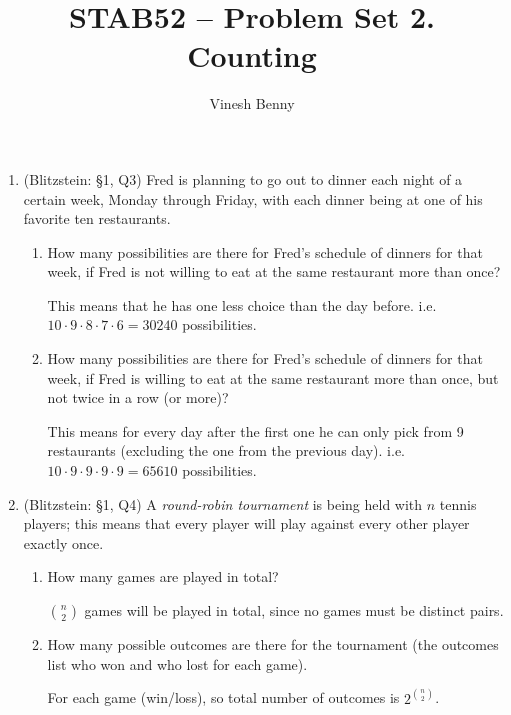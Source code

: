 \documentclass[11pt]{article}
\title{STAB52 -- Problem Set 2. Counting}
\author{Vinesh Benny}
\begin{document}
\begin{enumerate}
	\item (Blitzstein: \S 1, Q3) Fred is planning to go out to dinner each night of a certain week, Monday through Friday, with each dinner being at one of his favorite ten restaurants.
	\begin{enumerate}
		\item How many possibilities are there for Fred’s schedule of dinners for that week, if Fred is not willing to eat at the same restaurant more than once?
			\begin{mdframed}
				This means that he has one less choice than the day before. i.e. $ 10 \cdot 9 \cdot 8 \cdot 7 \cdot 6 = 30240$ possibilities.
			\end{mdframed}
		\item How many possibilities are there for Fred’s schedule of dinners for that week, if Fred is willing to eat at the same restaurant more than once, but not twice in a row (or more)?
			\begin{mdframed}
				This means for every day after the first one he can only pick from 9 restaurants (excluding the one from the previous day). i.e. $ 10 \cdot 9 \cdot 9 \cdot 9 \cdot 9 = 65610$ possibilities.
			\end{mdframed}
	\end{enumerate}

	\item (Blitzstein: \S 1, Q4) A \emph{round-robin tournament} is being held with $ n $ tennis players; this means that every player will play against every other player exactly once.
		\begin{enumerate}
			\item How many games are played in total?
				\begin{mdframed}
					$ \binom{n}{2} $ games will be played in total, since no games must be distinct pairs.
				\end{mdframed}
			\item How many possible outcomes are there for the tournament (the outcomes list who won and who lost for each game).
				\begin{mdframed}
					For each game (win/loss), so total number of outcomes is $ 2^{\binom{n}{2}}$.
				\end{mdframed}
		\end{enumerate}


\end{enumerate}
\end{document}
